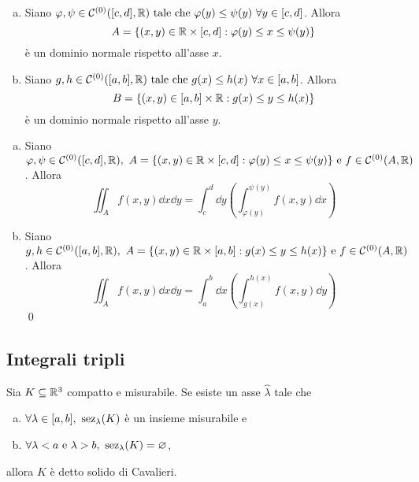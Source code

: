 \begin{definition}
    \leavevmode
    \begin{enumerate}[a.]
        \item Siano $\varphi, \psi \in \mathcal{C}^{(0)}([c,d],\mathbb{R}) \text{ tale che } \varphi(y)\leq \psi(y)\ \forall y \in [c,d]$. Allora
        $$
            A=\{(x,y)\in \mathbb{R}\times[c,d]:\varphi(y)\leq x \leq \psi(y)\}
        $$
        è un dominio normale rispetto all'asse $x$.
        \item Siano $g, h \in \mathcal{C}^{(0)}([a,b],\mathbb{R}) \text{ tale che } g(x)\leq h(x)\ \forall x \in [a,b]$. Allora
        $$
            B=\{(x,y)\in [a,b]\times\mathbb{R}:g(x)\leq y \leq h(x)\}
        $$
        è un dominio normale rispetto all'asse $y$. 
    \end{enumerate}
\end{definition}

\begin{theorem}
    \leavevmode
    \begin{enumerate}[a.]
        \item Siano $\varphi, \psi \in \mathcal{C}^{(0)}([c,d],\mathbb{R}), \ A=\{(x,y)\in \mathbb{R}\times[c,d]:\varphi(y)\leq x \leq \psi(y)\} \text{ e } f \in \mathcal{C}^{(0)}(A,\mathbb{R})$. Allora
        $$
            \iint_Af(x,y)\dd x\dd y = \int_c^d\dd y\left(\int_{\varphi(y)}^{\psi(y)}f(x,y)\dd x\right)
        $$
        \item Siano $g, h \in \C{0}([a,b],\R), \ A=\{(x,y)\in \R\times[a,b]:g(x)\leq y \leq h(x)\} \e f \in \C{0}(A,\R)$. Allora
        $$
            \iint_Af(x,y)\dd x\dd y = \int_a^b\dd x\left(\int_{g(x)}^{h(x)}f(x,y)\dd y\right)
        $$
        \qed
    \end{enumerate}
\end{theorem}

\subsection{Integrali tripli}

\begin{definition}
    Sia $K \subseteq \mathbb{R}^3$ compatto e misurabile. Se esiste un asse $\hat{\lambda}$ tale che
    \begin{enumerate}[a.]
        \item $\forall \lambda \in [a,b], \ \sez_\lambda(K)$ è un insieme misurabile e
        \item $\forall \lambda < a \text{ e } \lambda > b, \ \operatorname{sez}_\lambda (K) = \varnothing$,
    \end{enumerate}
    allora $K$ è detto solido di Cavalieri.
\end{definition}

